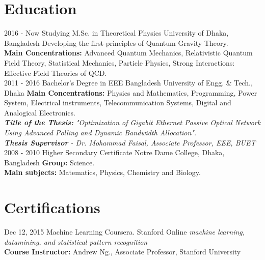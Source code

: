 \documentclass[]{friggeri-cv}
\begin{document}
\section{Education}
\begin{entrylist}
  \entry
    {2016 - Now}
    {Studying M.Sc. in Theoretical Physics}
    {University of Dhaka, Bangladesh}
    {Developing the first-principles of Quantum Gravity Theory.\\
    \textbf{Main Concentrations:} Advanced Quantum Mechanics, Relativistic Quantum Field Theory, Statistical Mechanics, Particle Physics, Strong Interactions: Effective Field Theories of QCD.\\}
    \entry
    {2011 - 2016}
    {Bachelor's Degree in EEE}
    {Bangladesh University of Engg. \& Tech., Dhaka}
    {\textbf{Main Concentrations:} Physics and Mathematics, Programming, Power System, Electrical instruments, Telecommunication Systems, Digital and Analogical Electronics.\\
    \emph{\textbf{Title of the Thesis:} "Optimization of Gigabit Ethernet Passive Optical Network Using Advanced Polling and Dynamic Bandwidth Allocation".}\\
    \emph{\textbf{Thesis Supervisor} - Dr. Mohammad Faisal, Associate Professor, EEE, BUET}\\}
  \entry
    {2008 - 2010}
    {Higher Secondary Certificate}
    {Notre Dame College, Dhaka, Bangladesh}
    {\textbf{Group:} Science.\\
    \textbf{Main subjects:} Matematics, Physics, Chemistry and Biology.}
\end{entrylist}

\section{Certifications}
\begin{entrylist}
  \entry
    {Dec 12, 2015}
    {Machine Learning}
    {Coursera. Stanford Online}
    {\emph{machine learning, datamining, and statistical pattern recognition}\\\textbf{Course Instructor:} Andrew Ng., Associate Professor, Stanford University}
\end{entrylist}
\end{document}
